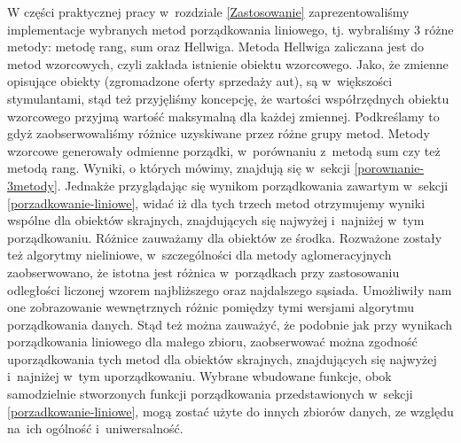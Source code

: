 \documentclass[12pt,a4paper]{report}
\begin{document}
W części praktycznej pracy w~rozdziale \ref{Zastosowanie} zaprezentowaliśmy implementacje wybranych metod porządkowania liniowego, tj. wybraliśmy 3 różne metody: metodę rang, sum oraz Hellwiga. Metoda Hellwiga zaliczana jest do metod wzorcowych, czyli zakłada istnienie obiektu wzorcowego. Jako, że zmienne opisujące obiekty (zgromadzone oferty sprzedaży aut), są w~większości stymulantami, stąd też przyjęliśmy koncepcję, że wartości współrzędnych obiektu wzorcowego przyjmą wartość maksymalną dla każdej zmiennej. Podkreślamy to gdyż zaobserwowaliśmy różnice uzyskiwane przez różne grupy metod. Metody wzorcowe generowały odmienne porządki, w~porównaniu z~metodą sum czy też metodą rang. Wyniki, o których mówimy, znajdują się w~sekcji \ref{porownanie-3metody}. Jednakże przyglądając się wynikom porządkowania zawartym  w~sekcji \ref{porzadkowanie-liniowe}, widać iż dla tych trzech metod otrzymujemy wyniki wspólne dla obiektów skrajnych, znajdujących się najwyżej i~najniżej w~tym porządkowaniu. Różnice zauważamy dla obiektów ze środka. %
Rozważone zostały też algorytmy nieliniowe, w~szczególności dla metody aglomeracyjnych zaobserwowano, że 
istotna jest różnica w~porządkach przy zastosowaniu odległości liczonej wzorem najbliższego oraz najdalszego sąsiada. Umożliwiły nam one zobrazowanie wewnętrznych różnic pomiędzy tymi wersjami algorytmu porządkowania danych. Stąd też można zauważyć, że podobnie jak przy wynikach porządkowania liniowego dla małego zbioru, zaobserwować można zgodność uporządkowania tych metod dla obiektów skrajnych, znajdujących się najwyżej i~najniżej w~tym uporządkowaniu.
Wybrane wbudowane funkcje, obok samodzielnie stworzonych funkcji porządkowania przedstawionych w~sekcji \ref{porzadkowanie-liniowe}, mogą zostać użyte do innych zbiorów danych, ze względu na~ich ogólność i~uniwersalność. 


 









\end{document}
